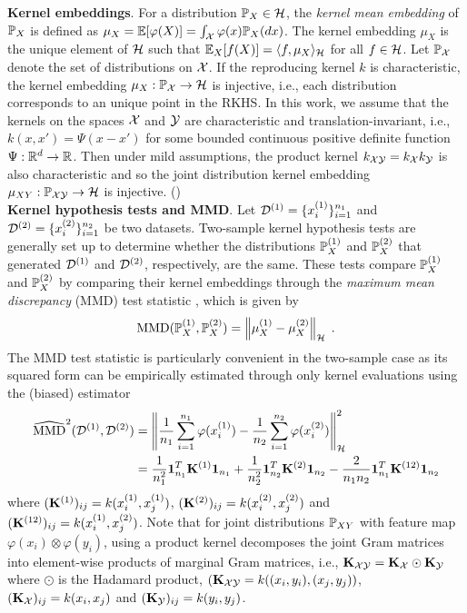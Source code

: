 \textbf{Kernel embeddings}. For a distribution $\P_X\in\calH$, the \textit{kernel mean embedding} of $\P_X$ is defined as $\mu_X=\E[\varphi(X)]=\int_\calX\varphi(x)\P_X(dx)$. The kernel embedding $\mu_X$ is the unique element of $\calH$ such that $\E_X[f(X)]=\langle f,\mu_X\rangle_\calH$ for all $f\in\calH$. Let $\P_\calX$ denote the set of distributions on $\calX$. If the reproducing kernel $k$ is characteristic, the kernel embedding $\mu_X:\P_\calX\rightarrow\calH$ is injective, i.e., each distribution corresponds to an unique point in the RKHS. In this work, we assume that the kernels on the spaces $\calX$ and $\calY$ are characteristic and translation-invariant, i.e., $k(x,x') = \Psi(x-x')$ for some bounded continuous positive definite function $\Psi:\bbR^d\rightarrow\bbR$. Then under mild assumptions, the product kernel $k_{\calX\calY}=k_\calX k_\calY$ is also characteristic \parencite[Corollary 11]{Sriperumbudur:2010} and so the joint distribution kernel embedding $\mu_{XY}:\P_{\calX\calY}\rightarrow\calH$ is injective. (\todo)
\\

\textbf{Kernel hypothesis tests and MMD}. Let $\calD^{(1)}=\{\xo_i\}_{i=1}^{n_1}$ and $\calD^{(2)}=\{\xt_i\}_{i=1}^{n_2}$ be two datasets. Two-sample kernel hypothesis tests are generally set up to determine whether the distributions $\P_X^{(1)}$ and $\P_X^{(2)}$ that generated $\calD^{(1)}$ and $\calD^{(2)}$, respectively, are the same. These tests compare $\P_X^{(1)}$ and $\P_X^{(2)}$ by comparing their kernel embeddings through the \textit{maximum mean discrepancy} (MMD) test statistic \parencite{Gretton:2012}, which is given by
\[
\MMD(\P_X^{(1)},\P_X^{(2)}) = \left\|\mu_X^{(1)}-\mu_X^{(2)}\right\|_\calH \;.
\]
The MMD test statistic is particularly convenient in the two-sample case as its squared form can be empirically estimated through only kernel evaluations using the (biased) estimator
\begin{align*}
\hatMMD^2(\calD^{(1)},\calD^{(2)}) &= \left\|\frac{1}{n_1}\sum_{i=1}^{n_1}\varphi(\xo_i)-\frac{1}{n_2}\sum_{i=1}^{n_2}\varphi(\xt_i)\right\|_\calH^2 \\
&= \frac{1}{n_1^2}\onevec_{n_1}^T\bfK^{(1)}\onevec_{n_1} + \frac{1}{n_2^2}\onevec_{n_2}^T\bfK^{(2)}\onevec_{n_2} - \frac{2}{n_1n_2}\onevec_{n_1}^T\bfK^{(12)}\onevec_{n_2}
\end{align*}
where $(\bfK^{(1)})_{ij}=k(\xo_i,\xo_j)$, $(\bfK^{(2)})_{ij}=k(\xt_i,\xt_j)$ and $(\bfK^{(12)})_{ij}=k(\xo_i,\xt_j)$. Note that for joint distributions $\P_{XY}$ with feature map $\varphi(x_i)\otimes\varphi(y_i)$, using a product kernel decomposes the joint Gram matrices into element-wise products of marginal Gram matrices, i.e., $\bfK_{\calX\calY} = \bfK_\calX\odot\bfK_\calY$ where $\odot$ is the Hadamard product, $(\bfK_{\calX\calY}=k((x_i,y_i),(x_j,y_j))$, $(\bfK_\calX)_{ij}=k(x_i,x_j)$ and $(\bfK_\calY)_{ij}=k(y_i,y_j)$.
\\

